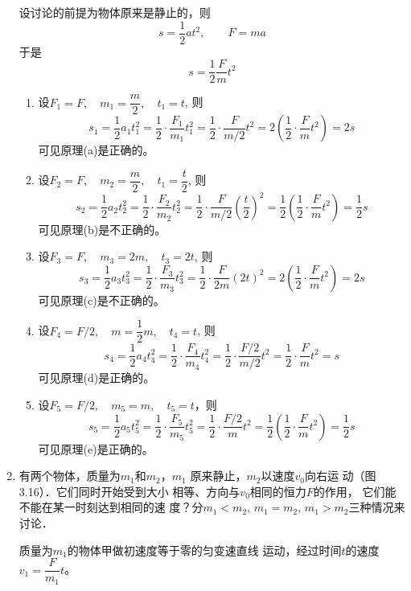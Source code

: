 \begin{enumerate}
\begin{solution}
设讨论的前提为物体原来是静止的，则
\[s=\frac{1}{2}at^2,\qquad F=ma\]
于是\[s=\frac{1}{2}\frac{F}{m}t^2\]
\begin{enumerate}
    \item 设$F_1=F,\quad m_1=\dfrac{m}{2},\quad t_1=t$, 则
\[s_1=\frac{1}{2}a_1t_1^2=\frac{1}{2}\cdot\frac{F_1}{m_1}t^2_1=\frac{1}{2}\cdot \frac{F}{m/2}t^2=2\left(\frac{1}{2}\cdot\frac{F}{m}t^2\right)=2s\]
可见原理(a)是正确的。
\item 设$F_2=F,\quad m_2=\dfrac{m}{2},\quad t_1=\dfrac{t}{2}$, 则
\[s_2=\frac{1}{2}a_2t_2^2=\frac{1}{2}\cdot\frac{F_2}{m_2}t^2_2=\frac{1}{2}\cdot \frac{F}{m/2}\left(\frac{t}{2}\right)^2=\frac{1}{2}\left(\frac{1}{2}\cdot\frac{F}{m}t^2\right)=\frac{1}{2}s\]
可见原理(b)是不正确的。
\item 设$F_3=F,\quad m_3=2m,\quad t_3=2t$, 则
\[s_3=\frac{1}{2}a_3t_3^2=\frac{1}{2}\cdot\frac{F_3}{m_3}t^2_3=\frac{1}{2}\cdot \frac{F}{2m}(2t)^2=2\left(\frac{1}{2}\cdot\frac{F}{m}t^2\right)=2s\]
可见原理(c)是不正确的。
\item 设$F_4=F/2,\quad m=\dfrac{1}{2}m,\quad t_4=t$, 则
\[s_4=\frac{1}{2}a_4t_4^2=\frac{1}{2}\cdot\frac{F_4}{m_4}t^2_4=\frac{1}{2}\cdot \frac{F/2}{m/2}t^2=\frac{1}{2}\cdot\frac{F}{m}t^2=s\]
可见原理(d)是正确的。
\item 设$F_5=F/2,\quad m_5=m,\quad t_5=t$，则
\[s_5=\frac{1}{2}a_5t_5^2=\frac{1}{2}\cdot\frac{F_5}{m_5}t^2_5=\frac{1}{2}\cdot \frac{F/2}{m}t^2=\frac{1}{2}\left(\frac{1}{2}\cdot\frac{F}{m}t^2\right)=\frac{1}{2}s\]
可见原理(e)是正确的。
\end{enumerate}    
    \end{solution}
\item   有两个物体，质量为$m_1$和$m_2$，$m_1$
原来静止，$m_2$以速度$v_0$向右运
动（图3.16）．它们同时开始受到大小
相等、方向与$v_0$相同的恒力$F$的作用，
它们能不能在某一时刻达到相同的速
度？分$m_1<m_2$, $m_1=m_2$, $m_1>m_2$三种情况来讨论．
\begin{figure}[htp]\centering
    \caption{}
    \end{figure}

\begin{solution}    
质量为$m_1$的物体甲做初速度等于零的匀变速直线
运动，经过时间$t$的速度$v_1=\dfrac{F}{m_1}t$。


\end{solution}
\end{enumerate}
